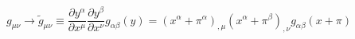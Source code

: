 \begin{equation}
g_{\mu \nu} \rightarrow \tilde{g}_{\mu \nu} \equiv \frac{\partial
y^{\alpha}}{\partial x^{\mu}} \frac{\partial y^{\beta}}{\partial x^{\nu}}
g_{\alpha \beta} ( y ) = ( x^{\alpha} + \pi^{\alpha} )_{, \mu} ( x^{\alpha}
+ \pi^{\beta} )_{, \nu} g_{\alpha \beta} ( x + \pi ) \label{piints}
\end{equation}

